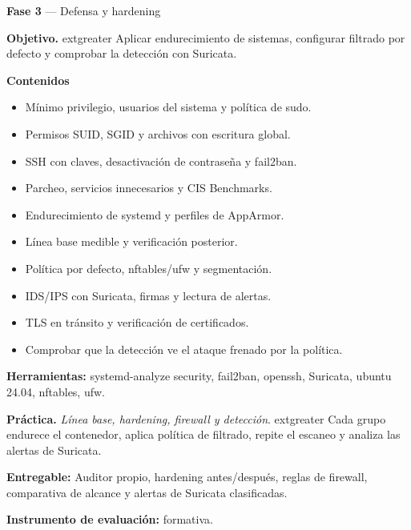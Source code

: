 \documentclass[11pt,a4paper]{article}
\begin{document}
\begin{tcolorbox}[cajaContenido,title={Semana 6 --- Hardening, firewall y detección}]
\textbf{Fase 3} --- Defensa y hardening

\textbf{Objetivo.} 	extgreater{} Aplicar endurecimiento de sistemas, configurar filtrado por defecto y comprobar la detección con Suricata.

\textbf{Contenidos}

\begin{itemize}[leftmargin=1.4em,itemsep=2pt,topsep=3pt]
  \item Mínimo privilegio, usuarios del sistema y política de sudo.
  \item Permisos SUID, SGID y archivos con escritura global.
  \item SSH con claves, desactivación de contraseña y fail2ban.
  \item Parcheo, servicios innecesarios y CIS Benchmarks.
  \item Endurecimiento de systemd y perfiles de AppArmor.
  \item Línea base medible y verificación posterior.
  \item Política por defecto, nftables/ufw y segmentación.
  \item IDS/IPS con Suricata, firmas y lectura de alertas.
  \item TLS en tránsito y verificación de certificados.
  \item Comprobar que la detección ve el ataque frenado por la política.
\end{itemize}

\textbf{Herramientas:} systemd-analyze security, fail2ban, openssh, Suricata, ubuntu 24.04, nftables, ufw.

\textbf{Práctica.} \emph{Línea base, hardening, firewall y detección}. 	extgreater{} Cada grupo endurece el contenedor, aplica política de filtrado, repite el escaneo y analiza las alertas de Suricata.

\textbf{Entregable:} Auditor propio, hardening antes/después, reglas de firewall, comparativa de alcance y alertas de Suricata clasificadas.

\textbf{Instrumento de evaluación:} formativa.
\end{tcolorbox}
\end{document}
